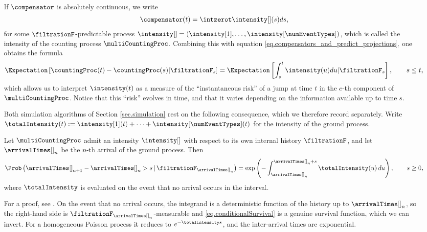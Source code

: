If $\compensator$ is absolutely continuous, we write
\begin{equation*}
 \compensator (t) = \intzerot \intensity[ ](s)ds,
\end{equation*}
for some $\filtrationF$-predictable process
$\intensity[ ] = (\intensity[1],\dots,\intensity[\numEventTypes])$,
which is called the intensity of the counting process $\multiCountingProc$.
Combining this with equation \eqref{eq.compensators_and_predict_projections},
one obtains the formula
\begin{equation*}
 \Expectation\left[ \countingProc(t)-\countingProc(s) \vert \filtrationF_s \right]
 =
 \Expectation\left[ \int_{s}^{t} \intensity(u) du
  \vert \filtrationF_s \right],
  \qquad  s\leq t,
\end{equation*}
which allows us to interpret $\intensity(t)$ as a measure of the ``instantaneous risk'' of a
jump at time $t$ in the $e$-th component of $\multiCountingProc$.
Notice that this ``risk'' evolves in time,
and that it varies depending on the information available up to time $s$.

Both simulation algorithms of Section \ref{sec.simulation} rest on the following
consequence, which we therefore record separately.
Write $\totalIntensity(t) := \intensity[1](t) + \dots + \intensity[\numEventTypes](t)$
for the intensity of the ground process.

\begin{prop}\label{prop.conditionalSurvival}
 Let $\multiCountingProc$ admit an intensity $\intensity[ ]$ with respect to its own
 internal history $\filtrationF$,
 and let $\arrivalTimes[ ]_{n}$ be the $n$-th arrival of the ground process.
 Then
 \begin{equation}\label{eq.conditionalSurvival}
  \Prob \left( \arrivalTimes[ ]_{n+1} - \arrivalTimes[ ]_{n} > s
  \, \vert \, \filtrationF_{\arrivalTimes[ ]_{n}} \right)
  =
  \exp \left( - \int_{\arrivalTimes[ ]_{n}}^{\arrivalTimes[ ]_{n}+s}
  \totalIntensity(u) \, du \right),
  \qquad s \geq 0,
 \end{equation}
 where $\totalIntensity$ is evaluated on the event that no arrival occurs in the interval.
\end{prop}

For a proof, see \cite[Chapter II]{Bre81poi}.
On the event that no arrival occurs, the integrand is a deterministic function of the history
up to $\arrivalTimes[ ]_{n}$,
so the right-hand side is $\filtrationF_{\arrivalTimes[ ]_{n}}$-measurable
and \eqref{eq.conditionalSurvival} is a genuine survival function, which we can invert.
For a homogeneous Poisson process it reduces to $e^{-\totalIntensity s}$,
and the inter-arrival times are exponential.

